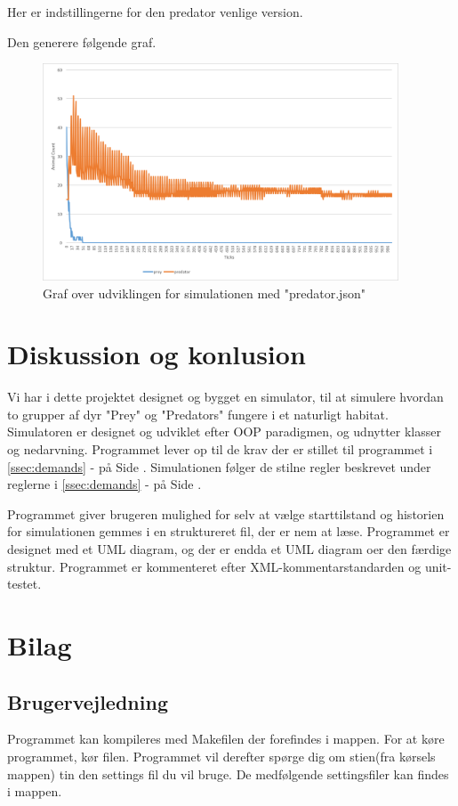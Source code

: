 \documentclass[a4paper]{article}
\newcommand{\namedref}[1]{\autoref{#1} - \nameref{#1} på Side \pageref{#1}}
\begin{document}
    Her er indstillingerne for den predator venlige version.
    

    Den generere følgende graf.
    \begin{figure}[H]
      \centering
      \includegraphics[width=400px]{figures/3sim.png}
      \caption{Graf over udviklingen for simulationen med "predator.json"}
      \label{fig:thirdSimulation}
    \end{figure}

	\section{Diskussion og konlusion} \label{sec:conclusion}
    Vi har i dette projektet designet og bygget en simulator,
    til at simulere hvordan to grupper af dyr "Prey" og "Predators" fungere i et naturligt habitat.
    Simulatoren er designet og udviklet efter OOP paradigmen, og udnytter klasser og nedarvning.
    Programmet lever op til de krav der er stillet til programmet i \namedref{ssec:demands}.
    Simulationen følger de stilne regler beskrevet under reglerne i \namedref{ssec:demands}.

    Programmet giver brugeren mulighed for selv at vælge starttilstand og 
    historien for simulationen gemmes i en struktureret fil, der er nem at læse.
    Programmet er designet med et UML diagram, og der er endda et UML diagram oer den færdige struktur.
    Programmet er kommenteret efter XML-kommentarstandarden og unit-testet.

  \section{Bilag}
      \subsection{Brugervejledning} \label{ssec:manual}
        Programmet kan kompileres med Makefilen der forefindes i  mappen.
        For at køre programmet, kør  filen.
        Programmet vil derefter spørge dig om stien(fra kørsels mappen) tin den settings fil du vil bruge.
        De medfølgende settingsfiler kan findes i  mappen.
\end{document}
